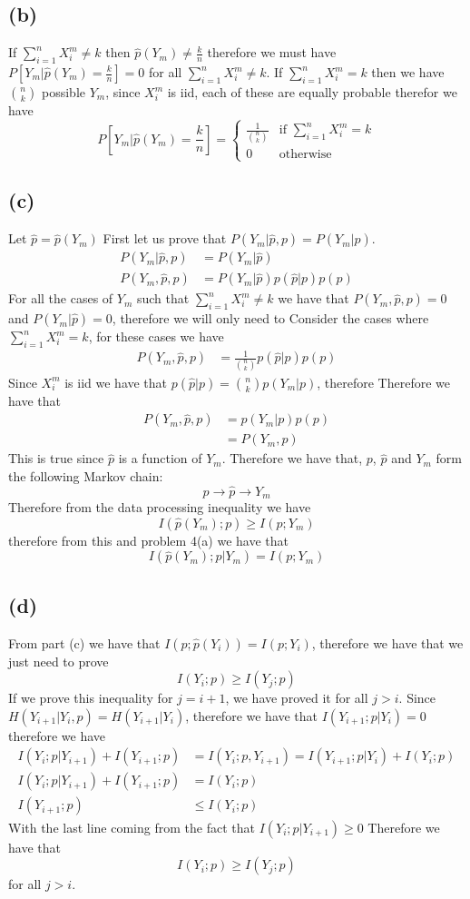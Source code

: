 \subsection*{(b)}
If $\sum_{i=1}^{n}X_{i}^m\neq k$ then  $\hat{p}(Y_m)\neq \frac{k}{n}$
therefore we must have 
$P[Y_m|\hat{p}(Y_m)=\frac{k}{n}]=0$ for all $\sum_{i=1}^{n}X_{i}^m\neq k$.
If $\sum_{i=1}^{n}X_{i}^m=k$ then we have $n \choose k$ possible 
$Y_m$, since $X_{i}^m$ is iid, each of these are equally probable therefor we have
$$P[Y_m|\hat{p}(Y_m)=\frac{k}{n}]=\begin{cases}
    \frac{1}{{n \choose k}} & \text{if } \sum_{i=1}^{n}X_{i}^m=k\\
    0 & \text{otherwise}
\end{cases}$$
\subsection*{(c)}
Let $\hat{p}=\hat{p}(Y_m)$ First let us prove that 
$P(Y_m|\hat{p},p)=P(Y_m|\hat{p})$.
\begin{align*}
    P(Y_m|\hat{p},p)&=P(Y_m|\hat{p})\\
    P(Y_m,\hat{p},p)&=P(Y_m|\hat{p})p(\hat{p}|p)p(p)
\end{align*}
For all the cases of $Y_m$ such that $\sum_{i=1}^{n}X_{i}^m\neq k$ we have that
$P(Y_m,\hat{p},p)=0$ and $P(Y_m|\hat{p})=0$, therefore we will only need to Consider
the cases where $\sum_{i=1}^{n}X_{i}^m=k$, for these cases we have
\begin{align*}
    P(Y_m,\hat{p},p)&=\frac{1}{{n\choose k}}p(\hat{p}|p)p(p)
\end{align*}
Since $X_{i}^m$ is iid we have that $p(\hat{p}|p)={n\choose k}p(Y_m|p)$, therefore
Therefore we have that 
\begin{align*}
    P(Y_m,\hat{p},p)&=p(Y_m|p)p(p)\\
    &=P(Y_m,p)
\end{align*}
This is true since $\hat{p}$ is a function of $Y_m$. Therefore we have that,
$p$, $\hat{p}$ and $Y_m$ form the following Markov chain:
$$p\rightarrow \hat{p}\rightarrow Y_m$$
Therefore from the data processing inequality we have 
$$I(\hat{p}(Y_m);p)\geq I(p;Y_m)$$
therefore from this and problem 4(a) we have that
$$I(\hat{p}(Y_m);p|Y_m)= I(p;Y_m)$$
\subsection*{(d)}
From part (c) we have that $I(p;\hat{p}(Y_i))=I(p;Y_i)$, therefore we have that
we just need to prove 
$$I(Y_{i};p)\geq I(Y_{j};p)$$
If we prove this inequality for $j=i+1$, we have
proved it for all $j>i$. Since $H(Y_{i+1}|Y_i,p)=H(Y_{i+1}|Y_i)$, therefore we have that 
$I(Y_{i+1};p|Y_i)=0$ therefore we have
\begin{align*}
    I(Y_i;p|Y_{i+1})+I(Y_{i+1};p)&=I(Y_i;p,Y_{i+1})=I(Y_{i+1};p|Y_i)+I(Y_{i};p)\\
    I(Y_i;p|Y_{i+1})+I(Y_{i+1};p)&=I(Y_{i};p)\\
    I(Y_{i+1};p)&\leq I(Y_{i};p)
\end{align*}
With the last line coming from the fact that $I(Y_i;p|Y_{i+1})\geq0$
Therefore we have that 
$$I(Y_{i};p)\geq I(Y_{j};p)$$
for all $j>i$.
